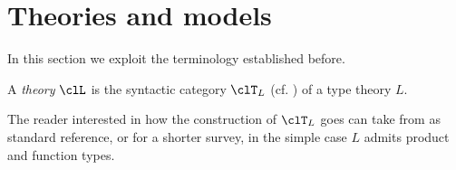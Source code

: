 \section{Theories and models}
\label{sec:orge02f333}
In this section we exploit the terminology established before.
\begin{definition}[Theory]\label{teoria}
	A \emph{theory} $\clL$ is the syntactic category $\clT_L$ (cf. \cite{lambek1988introduction}) of a type theory $L$.
\end{definition}
The reader interested in how the construction of $\clT_L$ goes can take from \cite{lambek1988introduction} as standard reference, or \cite{abramskyno} for a shorter survey, in the simple case $L$ admits product and function types.


